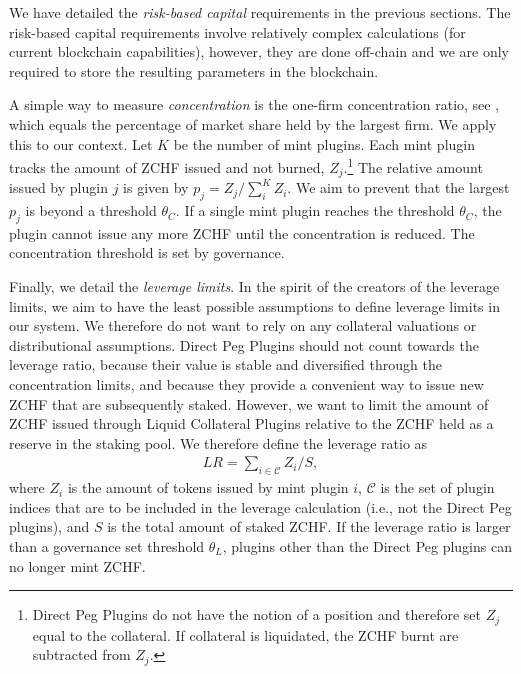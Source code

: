 \documentclass[english,11pt]{article}
\begin{document}
We have detailed the \emph{risk-based capital} requirements in the previous sections.
The risk-based capital requirements involve relatively complex calculations
(for current blockchain capabilities), however, they are done off-chain and we are only required to store the resulting
parameters in the blockchain.

A simple way to measure \emph{concentration} is the one-firm concentration ratio,
see \cite{curry1983industrial}, which equals the percentage of market share held by the largest firm. We apply this to our context. Let $K$ be the number of mint plugins. Each mint plugin tracks the amount of ZCHF issued and not burned, $Z_j$.\footnote{Direct Peg Plugins
do not have the notion of a position and therefore set $Z_j$ equal to the
collateral. If collateral is liquidated, the ZCHF burnt are subtracted from
$Z_j$.}
The relative amount issued by plugin $j$ is given by $p_j=Z_j/\sum_i^K Z_i$. We aim to prevent that the largest
$p_j$ is beyond a threshold $\theta_C$. If a single mint plugin reaches the threshold 
$\theta_C$,
the plugin cannot issue any more ZCHF until the concentration is reduced. The
concentration threshold is set by governance.

Finally, we detail the \emph{leverage limits}. In the spirit of the
creators of the leverage limits, we aim to have the least possible assumptions
to define leverage limits in our system. We therefore do not want to rely on any 
collateral valuations or distributional assumptions.
Direct Peg Plugins should not count towards the leverage ratio,
because their value is stable and diversified through the concentration limits,
and because they provide a convenient way to issue new 
ZCHF that are subsequently staked. However, we want to limit the
amount of ZCHF issued through Liquid Collateral Plugins relative to the ZCHF
held as a reserve in the staking pool. We therefore define the leverage ratio
as
\begin{align}
LR = \sum_{i \in \mathcal{C}} Z_i/S,
\end{align}
where $Z_i$ is the amount of tokens issued by mint plugin $i$, $\mathcal{C}$
is the set of plugin indices that are to be included in the leverage
calculation (i.e., not the Direct Peg plugins), and $S$ is the total amount
of staked ZCHF. If the leverage ratio is larger than a governance set threshold $\theta_L$,
plugins other than the Direct Peg plugins can no longer mint ZCHF.
\end{document}
